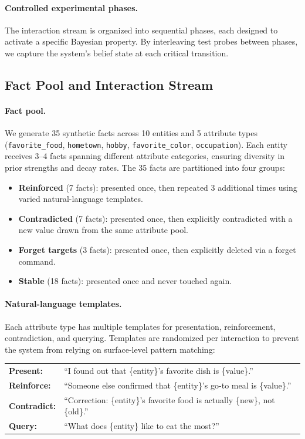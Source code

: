 \paragraph{Controlled experimental phases.}
The interaction stream is organized into sequential phases, each designed to activate a specific Bayesian property. By interleaving test probes between phases, we capture the system's belief state at each critical transition.


\subsection{Fact Pool and Interaction Stream}
\label{sec:bench-facts}

\paragraph{Fact pool.}
We generate 35 synthetic facts across 10 entities and 5 attribute types (\texttt{favorite\_food}, \texttt{hometown}, \texttt{hobby}, \texttt{favorite\_color}, \texttt{occupation}). Each entity receives 3--4 facts spanning different attribute categories, ensuring diversity in prior strengths and decay rates. The 35 facts are partitioned into four groups:

\begin{itemize}[nosep,leftmargin=1.5em]
  \item \textbf{Reinforced} (7 facts): presented once, then repeated 3 additional times using varied natural-language templates.
  \item \textbf{Contradicted} (7 facts): presented once, then explicitly contradicted with a new value drawn from the same attribute pool.
  \item \textbf{Forget targets} (3 facts): presented once, then explicitly deleted via a forget command.
  \item \textbf{Stable} (18 facts): presented once and never touched again.
\end{itemize}

\paragraph{Natural-language templates.}
Each attribute type has multiple templates for presentation, reinforcement, contradiction, and querying. Templates are randomized per interaction to prevent the system from relying on surface-level pattern matching:

\smallskip
\noindent
\begin{tabular}{@{}l l@{}}
  \textbf{Present:}     & ``I found out that \{entity\}'s favorite dish is \{value\}.'' \\
  \textbf{Reinforce:}   & ``Someone else confirmed that \{entity\}'s go-to meal is \{value\}.'' \\
  \textbf{Contradict:}  & ``Correction: \{entity\}'s favorite food is actually \{new\}, not \{old\}.'' \\
  \textbf{Query:}       & ``What does \{entity\} like to eat the most?'' \\
\end{tabular}

